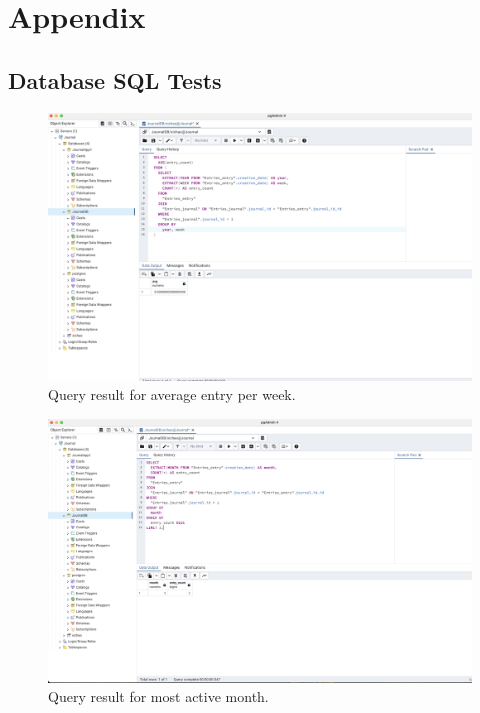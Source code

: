 \chapter{Appendix}

\section{Database SQL Tests}

\begin{figure}[H]
    \includegraphics[width=\textwidth]{Assets/test_average_entry_per_week.png}
    \caption{Query result for average entry per week.}
    \label{fig:average_entry_per_week}
\end{figure}

\begin{figure}[H]
    \includegraphics[width=\textwidth]{Assets/test_most_active_month.png}
    \caption{Query result for most active month.}
    \label{fig:most_active_month}
\end{figure}

